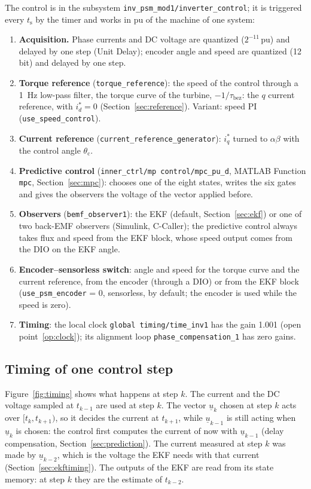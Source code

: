 \documentclass[11pt,a4paper]{scrartcl}
\newcommand{\ped}[1]{_{\mathrm{#1}}}
\newcommand{\code}[1]{\texttt{#1}}
\newcommand{\pun}{\,\mathrm{pu}}
\begin{document}
\begin{onehalfspace}
The control is in the subsystem \code{inv\_psm\_mod1/inverter\_control}; it is triggered every $t\ped{s}$ by the timer and works in pu of the machine of one system:
\begin{enumerate}[nosep]
	\item \textbf{Acquisition.} Phase currents and DC voltage are quantized ($2^{-11}\pun$) and delayed by one step (Unit Delay); encoder angle and speed are quantized (12 bit) and delayed by one step.
	\item \textbf{Torque reference} (\code{torque\_reference}): the speed of the control through a \SI{1}{\hertz} low-pass filter, the torque curve of the turbine, $-1/\tau\ped{bez}$: the $q$ current reference, with $i_d^* = 0$ (Section~\ref{sec:reference}). Variant: speed PI (\code{use\_speed\_control}).
	\item \textbf{Current reference} (\code{current\_reference\_generator}): $i_q^*$ turned to $\alpha\beta$ with the control angle $\theta\ped{c}$.
	\item \textbf{Predictive control} (\code{inner\_ctrl/mp control/mpc\_pu\_d}, MATLAB Function \code{mpc}, Section~\ref{sec:mpc}): chooses one of the eight states, writes the six gates and gives the observers the voltage of the vector applied before.
	\item \textbf{Observers} (\code{bemf\_observer1}): the EKF (default, Section~\ref{sec:ekf}) or one of two back-EMF observers (Simulink, C-Caller); the predictive control always takes flux and speed from the EKF block, whose speed output comes from the DIO on the EKF angle.
	\item \textbf{Encoder--sensorless switch}: angle and speed for the torque curve and the current reference, from the encoder (through a DIO) or from the EKF block (\code{use\_psm\_encoder} = 0, sensorless, by default; the encoder is used while the speed is zero).
	\item \textbf{Timing}: the local clock \code{global timing/time\_inv1} has the gain 1.001 (open point~\ref{op:clock}); its alignment loop \code{phase\_compensation\_1} has zero gains.
\end{enumerate}

\subsection{Timing of one control step}
\label{sec:timing}

Figure~\ref{fig:timing} shows what happens at step $k$. The current and the DC voltage sampled at $t_{k-1}$ are used at step $k$. The vector $\underline{u}_k$ chosen at step $k$ acts over $[t_k, t_{k+1})$, so it decides the current at $t_{k+1}$, while $\underline{u}_{k-1}$ is still acting when $\underline{u}_k$ is chosen: the control first computes the current of now with $\underline{u}_{k-1}$ (delay compensation, Section~\ref{sec:prediction}). The current measured at step $k$ was made by $\underline{u}_{k-2}$, which is the voltage the EKF needs with that current (Section~\ref{sec:ekftiming}). The outputs of the EKF are read from its state memory: at step $k$ they are the estimate of $t_{k-2}$.


\end{onehalfspace}
\end{document}
